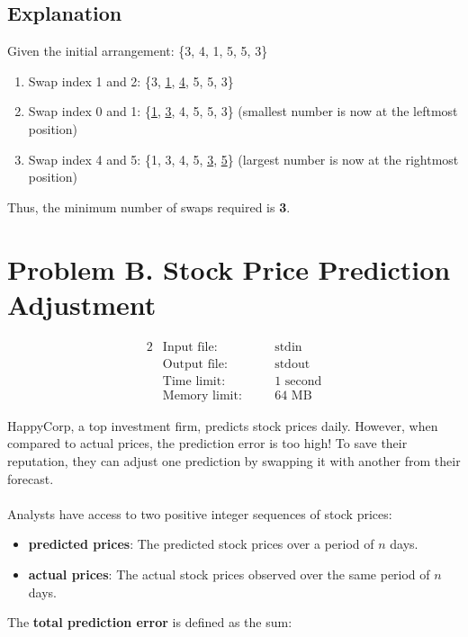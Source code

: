 \documentclass[12pt,a4paper]{article}
\begin{document}
\subsection*{\fontsize{16}{12}Explanation}
Given the initial arrangement: \{3, 4, 1, 5, 5, 3\}

\begin{enumerate}
    \item Swap index 1 and 2: \{3, \underline{1}, \underline{4}, 5, 5, 3\}
    \item Swap index 0 and 1: \{\underline{1}, \underline{3}, 4, 5, 5, 3\} (smallest number is now at the leftmost position)
    \item Swap index 4 and 5: \{1, 3, 4, 5, \underline{3}, \underline{5}\} (largest number is now at the rightmost position)
\end{enumerate}
Thus, the minimum number of swaps required is \textbf{3}.
\newpage
\section*{\fontsize{18}{12}Problem B. Stock Price Prediction Adjustment}

\begin{alignat*} {2}
 &   \text{Input file:}   \quad     &&\text{stdin}\\
 &   \text{Output file:}  \quad     &&\text{stdout}\\
 &   \text{Time limit:}   \quad     &&\text{1 second}\\
 &   \text{Memory limit:} \quad     &&\text{64 MB}
\end{alignat*}

\noindent
HappyCorp, a top investment firm, predicts stock prices daily. However, when compared to actual prices, the prediction error is too high! To save their reputation, they can adjust one prediction by swapping it with another from their forecast. 
\\\\
\noindent
Analysts have access to two positive integer sequences of stock prices:

\begin{itemize}
    \item \textbf{predicted prices}: The predicted stock prices over a period of $n$ days.
    \item \textbf{actual prices}: The actual stock prices observed over the same period of $n$ days.
\end{itemize}

\noindent 
The \textbf{total prediction error} is defined as the sum:
\end{document}
